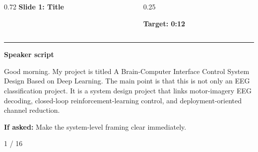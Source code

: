 \documentclass[aspectratio=169,10pt]{beamer}
\begin{document}
\begin{frame}[plain]
\vspace*{0.16cm}
\begin{columns}[T,totalwidth=\textwidth]
\begin{column}{0.72\textwidth}
{\fontsize{17}{18.5}\selectfont\bfseries Slide 1: Title}
\end{column}
\begin{column}{0.25\textwidth}
\raggedleft
\colorbox{noteCream}{\parbox{0.88\linewidth}{\centering\bfseries Target: 0:12}}
\end{column}
\end{columns}
\vspace{0.10cm}
{\color{uomPurple}\rule{\textwidth}{1.2pt}}
\vspace{0.18cm}
{\color{uomPurple}\bfseries Speaker script}
\vspace{0.06cm}
\setlength{\fboxsep}{6pt}
\noindent\colorbox{panelGrey}{\begin{minipage}{0.94\textwidth}
\justifying\fontsize{11.0}{13.4}\selectfont
Good morning. My project is titled A Brain-Computer Interface Control System Design Based on Deep Learning. The main point is that this is not only an EEG classification project. It is a system design project that links motor-imagery EEG decoding, closed-loop reinforcement-learning control, and deployment-oriented channel reduction.
\end{minipage}}
\vspace{0.22cm}
\noindent\colorbox{noteCream}{\begin{minipage}{0.94\textwidth}
\fontsize{9.6}{11.6}\selectfont
{\bfseries If asked:} Make the system-level framing clear immediately.
\end{minipage}}
\vfill
\hfill{\color{textDark}\scriptsize 1 / 16}
\end{frame}
\end{document}
